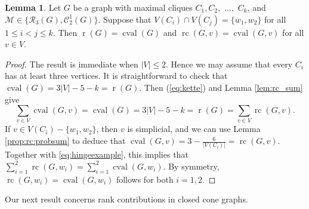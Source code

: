 \documentclass[11pt,a4paper]{article}
\theoremstyle{definition}
\newtheorem{lemma}[theorem]{Lemma}
\DeclareMathOperator{\rr}{r}
\DeclareMathOperator{\rc}{rc}
\DeclareMathOperator{\cval}{cval}
\newcommand{\cR}{\mathcal{R}}
\newcommand{\cM}{\mathcal{M}}
\newcommand{\cC}{\mathcal{C}}
\begin{document}
\begin{lemma}\label{lem:cliques}
Let  $G$ be a graph with  maximal cliques $C_1, C_2,$ $\dots,$ $C_k$, 
and  $\cM\in\{\cR_3(G),\cC_2^1(G)\}$. Suppose that $V(C_i)\cap V(C_j)=\{w_1,w_2\}$ for all $1\le i< j \leq k$.
Then $\rr(G)=\cval(G)$ and $\rc(G,v)=\cval(G,v)$ for all $v\in V$.
\end{lemma}
\begin{proof} The result is immediate when $|V|\leq2$. Hence we may
assume that every $C_i$ has at least three vertices. It is straightforward to check that $\cval(G)=3|V|-5-k=\rr(G)$. Then (\ref{eq:kette}) and Lemma \ref{lem:rc_sum} give 
\begin{equation}\label{eq:hingeexample}
\sum_{v\in V}\cval(G,v)=\cval(G)=3|V|-5-k=\rr(G)=\sum_{v\in V}\rc(G,v).
\end{equation}
If $v\in V(C_i)-\{w_1,w_2\}$, then $v$ is simplicial, and we can use Lemma \ref{prop:rc:probsum}  to deduce that  %
$\cval(G,v)=3-\frac{6}{|V(C_i)|}=\rc(G,v)$.
Together with \eqref{eq:hingeexample}, this implies that
$\sum_{i=1}^2\rc(G,w_i)=\sum_{i=1}^2\cval(G,w_i).$
By symmetry, $\rc(G,w_i)=\cval(G,w_i)$ follows for both $i=1,2$.
\end{proof}

Our next result concerns rank contributions in closed cone graphs.
\end{document}
